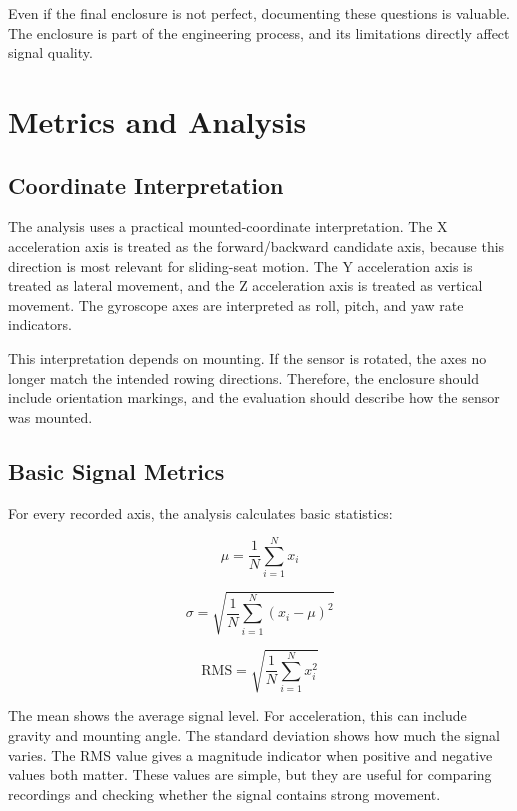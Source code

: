 Even if the final enclosure is not perfect, documenting these questions is valuable. The enclosure is part of the engineering process, and its limitations directly affect signal quality.


\chapter{Metrics and Analysis} %

\section{Coordinate Interpretation}

The analysis uses a practical mounted-coordinate interpretation. The X acceleration axis is treated as the forward/backward candidate axis, because this direction is most relevant for sliding-seat motion. The Y acceleration axis is treated as lateral movement, and the Z acceleration axis is treated as vertical movement. The gyroscope axes are interpreted as roll, pitch, and yaw rate indicators.

This interpretation depends on mounting. If the sensor is rotated, the axes no longer match the intended rowing directions. Therefore, the enclosure should include orientation markings, and the evaluation should describe how the sensor was mounted.

\section{Basic Signal Metrics}

For every recorded axis, the analysis calculates basic statistics:

\begin{equation}
  \mu = \frac{1}{N}\sum_{i=1}^{N} x_i
\end{equation}

\begin{equation}
  \sigma = \sqrt{\frac{1}{N}\sum_{i=1}^{N}(x_i - \mu)^2}
\end{equation}

\begin{equation}
  \text{RMS} = \sqrt{\frac{1}{N}\sum_{i=1}^{N}x_i^2}
\end{equation}

The mean shows the average signal level. For acceleration, this can include gravity and mounting angle. The standard deviation shows how much the signal varies. The RMS value gives a magnitude indicator when positive and negative values both matter. These values are simple, but they are useful for comparing recordings and checking whether the signal contains strong movement.

